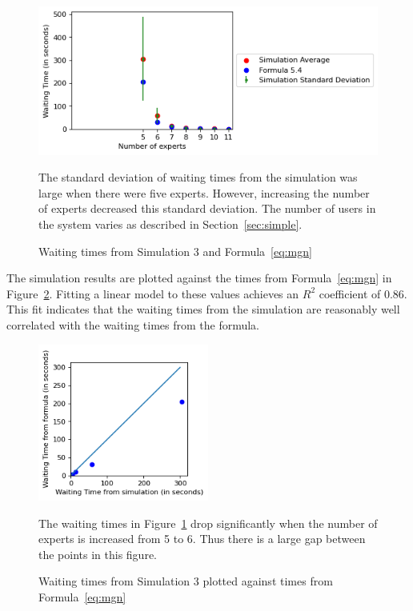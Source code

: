 \begin{figure}[h]
  \includegraphics{figures/montecarlo/full_expected_sim.png}
  \begin{captiontext}
    The standard deviation of waiting times from the simulation was large when
    there were five experts.
    However, increasing the number of experts decreased this standard deviation.
    The number of users in the system varies as described in
    Section~\ref{sec:simple}.
  \end{captiontext}
  \caption{
    Waiting times from Simulation 3 and Formula~\ref{eq:mgn}
  }\label{fig:full_expected_sim}
\end{figure}

The simulation results are plotted against the times from Formula~\ref{eq:mgn}
in Figure~\ref{fig:gof}.
Fitting a linear model to these values achieves an $R^2$ coefficient of 0.86.
This fit indicates that the waiting times from the simulation are reasonably
well correlated with the waiting times from the formula.

\begin{figure}[H]
  \includegraphics[width=0.5\textwidth]{figures/montecarlo/gof.png}
  \begin{captiontext}
    The waiting times in Figure~\ref{fig:full_expected_sim} drop significantly
    when the number of experts is increased from 5 to 6.
    Thus there is a large gap between the points in this figure.
  \end{captiontext}
  \caption{
    Waiting times from Simulation 3 plotted against times from
    Formula~\ref{eq:mgn}
  }\label{fig:gof}
\end{figure}

